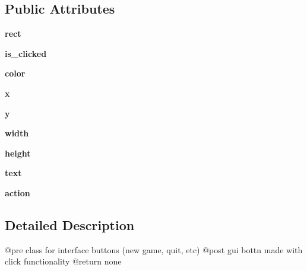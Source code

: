 \subsection*{Public Attributes}
\begin{DoxyCompactItemize}
\item 
\mbox{\label{classsweeper___u_i_1_1gui__button_a3492d23a9bcb070939af0eac1bb08f74}} 
{\bfseries rect}
\item 
\mbox{\label{classsweeper___u_i_1_1gui__button_ace5f8251300c44fd22fa6a8e9ab9d10c}} 
{\bfseries is\+\_\+clicked}
\item 
\mbox{\label{classsweeper___u_i_1_1gui__button_ac9e5a3d4473d226979892aeefae43583}} 
{\bfseries color}
\item 
\mbox{\label{classsweeper___u_i_1_1gui__button_a2834d096869622fc140f28b308344c9f}} 
{\bfseries x}
\item 
\mbox{\label{classsweeper___u_i_1_1gui__button_ad98d63a4f584e93a167daa2dc329745a}} 
{\bfseries y}
\item 
\mbox{\label{classsweeper___u_i_1_1gui__button_a4e290955243c3c6364a335991de7f4a7}} 
{\bfseries width}
\item 
\mbox{\label{classsweeper___u_i_1_1gui__button_ab0942e1c076d3171e51f5bc76a6e4a30}} 
{\bfseries height}
\item 
\mbox{\label{classsweeper___u_i_1_1gui__button_a4cd920fa66d99b239d0d8efbabe48ddf}} 
{\bfseries text}
\item 
\mbox{\label{classsweeper___u_i_1_1gui__button_a1686cd4588880a0f42303a5726b8c7f6}} 
{\bfseries action}
\end{DoxyCompactItemize}


\subsection{Detailed Description}
\begin{DoxyVerb}@pre class for interface buttons (new game, quit, etc)
@post gui bottn made with click functionality
@return none
\end{DoxyVerb}
 

